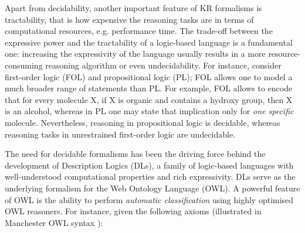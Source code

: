 \documentclass[10pt]{bmc_article}
\newenvironment{bmcformat}{\baselineskip20pt\sloppy\setboolean{publ}{false}}{\baselineskip20pt\sloppy}
\begin{document}
\begin{bmcformat}
Apart from decidability, another important feature of KR formalisms is tractability, that is how expensive the reasoning tasks are in terms of computational resources, e.g. performance time. The trade-off between the expressive power and the tractability of a logic-based language is a fundamental one: increasing the expressivity of the language usually results in a more resource-consuming reasoning algorithm or even undecidability. For instance, consider first-order logic (FOL) and propositional logic (PL); FOL allows one to model a much broader range of statements than PL. For example, FOL allows to encode that for every molecule X, if X is organic and contains a hydroxy group, then X is an alcohol, whereas in PL one may state that implication only for \emph{one specific} molecule. Nevertheless, reasoning in propositional logic is decidable, whereas reasoning tasks in unrestrained first-order logic are undecidable.

The need for decidable formalisms has been the driving force behind the development of Description Logics (DLs), a family of logic-based languages with well-understood computational properties and rich expressivity. DLs serve as the underlying formalism for the Web Ontology Language (OWL). %
A powerful feature of OWL is the ability to perform \emph{automatic classification} using highly optimised OWL reasoners. For instance, given the following axioms (illustrated in Manchester OWL syntax \cite{horridgems2009}):


\end{bmcformat}
\end{document}

